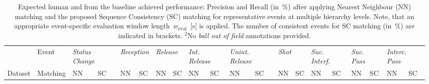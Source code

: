 \begin{table*}[tbh!]
\caption{Expected human and from the baseline achieved performance: Precision and Recall (in~$\%$) after applying Nearest Neighbour (NN) matching and the proposed Sequence Consistency (SC) matching for representative events at multiple hierarchy levels. Note, that an appropriate event-specific evaluation window length~$w_\text{eval}$~[s] is applied. The number of consistent events for SC matching (in~$\%$) are indicated in brackets. {\normalfont\footnotesize $^2$No \emph{ball out of field} annotations provided.}}
\label{tab:aggreement_nn_cm}
\centering
\setlength{\tabcolsep}{2.2pt}
\small
\fontsize{7}{10}\selectfont
\def\arraystretch{1.0} %
\begin{tabularx}{\textwidth}{l|l|llllllllllllllllll}
\toprule
                        & Event                    & \multicolumn{2}{l}{\emph{Status Change}}   & \multicolumn{2}{l}{\emph{Reception}}   & \multicolumn{2}{l}{\emph{Release}}   & \multicolumn{2}{l}{\emph{Int. Release}}   & \multicolumn{2}{l}{\emph{Unint. Release}}   & \multicolumn{2}{l}{\emph{Shot}}   & \multicolumn{2}{l}{\emph{Suc. Interf.}}   & \multicolumn{2}{l}{\emph{Suc. Pass}}   & \multicolumn{2}{l}{\emph{Interc. Pass}}   \\
Dataset                 & Matching                 & NN       & SC           & NN       & SC           & NN       & SC           & NN       & SC           & NN       & SC           & NN      & SC            & NN       & SC           & NN       & SC           & NN       & SC           \\ \hline 


\end{tabularx}
\end{table*}
